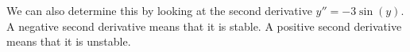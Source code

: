 \begin{itemize}
\begin{example}
              We can also determine this by looking at the second derivative $y''=-3\sin(y)$. A negative second derivative means that it is stable. A positive second derivative means that it is unstable.
          \end{example}
\end{itemize}